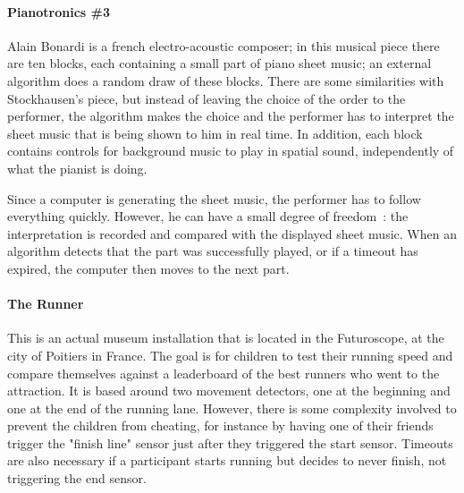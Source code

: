 \documentclass{sigchi}
\begin{document}
\paragraph{Pianotronics \#3}
Alain Bonardi is a french electro-acoustic composer; in this musical piece there are ten blocks, each containing a small part of piano sheet music; an external algorithm does a random draw of these blocks. There are some similarities with Stockhausen's piece, but instead of leaving the choice of the order to the performer, the algorithm makes the choice and the performer has to interpret the sheet music that is being shown to him in real time. In addition, each block contains controls for background music to play in spatial sound, independently of what the pianist is doing.

Since a computer is generating the sheet music, the performer has to follow everything quickly. However, he can have a small degree of freedom~: the interpretation is recorded and compared with the displayed sheet music. When an algorithm detects that the part was successfully played, or if a timeout has expired, the computer then moves to the next part.

\paragraph{The Runner}
This is an actual museum installation that is located in the Futuroscope, at the city of Poitiers in France. The goal is for children to test their running speed and compare themselves against a leaderboard of the best runners who went to the attraction. It is based around two movement detectors, one at the beginning and one at the end of the running lane. However, there is some complexity involved to prevent the children from cheating, for instance by having one of their friends trigger the "finish line" sensor just after they triggered the start sensor. Timeouts are also necessary if a participant starts running but decides to never finish, not triggering the end sensor.
\end{document}

